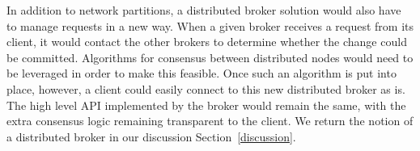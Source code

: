 In addition to network partitions, a distributed broker 
solution would also have to manage requests in a new way.
When a given broker receives a request from its client,
it would contact the other brokers to determine whether the change could be committed.
Algorithms for consensus between distributed nodes would need to be leveraged
in order to make this feasible.
Once such an algorithm is put into place, however,
a client could easily connect to this new distributed broker as is.
The high level API implemented by the broker would remain the same,
with the extra consensus logic remaining transparent to the client.
We return the notion of a distributed broker in our discussion
Section~\ref{discussion}.
